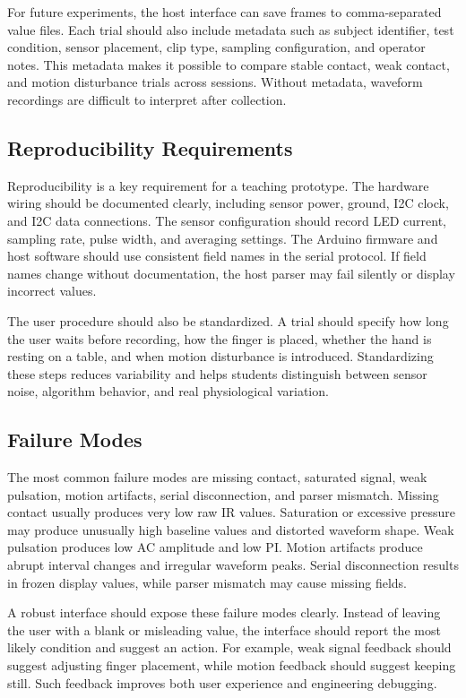 \documentclass[10pt,conference]{IEEEtran}
\begin{document}
For future experiments, the host interface can save frames to comma-separated value files. Each trial should also include metadata such as subject identifier, test condition, sensor placement, clip type, sampling configuration, and operator notes. This metadata makes it possible to compare stable contact, weak contact, and motion disturbance trials across sessions. Without metadata, waveform recordings are difficult to interpret after collection.

\subsection{Reproducibility Requirements}
Reproducibility is a key requirement for a teaching prototype. The hardware wiring should be documented clearly, including sensor power, ground, I2C clock, and I2C data connections. The sensor configuration should record LED current, sampling rate, pulse width, and averaging settings. The Arduino firmware and host software should use consistent field names in the serial protocol. If field names change without documentation, the host parser may fail silently or display incorrect values.

The user procedure should also be standardized. A trial should specify how long the user waits before recording, how the finger is placed, whether the hand is resting on a table, and when motion disturbance is introduced. Standardizing these steps reduces variability and helps students distinguish between sensor noise, algorithm behavior, and real physiological variation.

\subsection{Failure Modes}
The most common failure modes are missing contact, saturated signal, weak pulsation, motion artifacts, serial disconnection, and parser mismatch. Missing contact usually produces very low raw IR values. Saturation or excessive pressure may produce unusually high baseline values and distorted waveform shape. Weak pulsation produces low AC amplitude and low PI. Motion artifacts produce abrupt interval changes and irregular waveform peaks. Serial disconnection results in frozen display values, while parser mismatch may cause missing fields.

A robust interface should expose these failure modes clearly. Instead of leaving the user with a blank or misleading value, the interface should report the most likely condition and suggest an action. For example, weak signal feedback should suggest adjusting finger placement, while motion feedback should suggest keeping still. Such feedback improves both user experience and engineering debugging.
\end{document}

